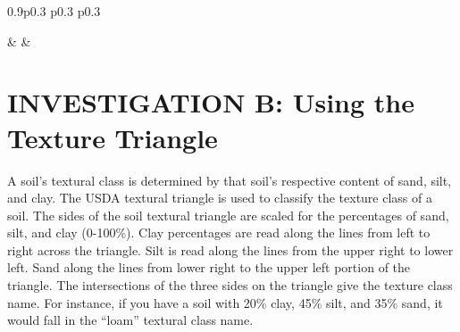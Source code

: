 \documentclass[
  letterpaper,
  twocolumn,
  portrait]{scrbook}
\begin{document}
\begin{table}[h!]
\begin{centerbox}
\begin{threeparttable}
\begin{tabularx}{0.9\textwidth}{p{} p{} p{}}

 &
 &
 \tabularnewline[-0.5pt]


\end{tabularx}
\end{threeparttable}\par\end{centerbox}

\end{table}
 

\hypertarget{investigation-b-using-the-texture-triangle}{%
\section{INVESTIGATION B: Using the Texture
Triangle}\label{investigation-b-using-the-texture-triangle}}

A soil's textural class is determined by that soil's respective content
of sand, silt, and clay. The USDA textural triangle is used to classify
the texture class of a soil. The sides of the soil textural triangle are
scaled for the percentages of sand, silt, and clay (0-100\%). Clay
percentages are read along the lines from left to right across the
triangle. Silt is read along the lines from the upper right to lower
left. Sand along the lines from lower right to the upper left portion of
the triangle. The intersections of the three sides on the triangle give
the texture class name. For instance, if you have a soil with 20\% clay,
45\% silt, and 35\% sand, it would fall in the ``loam'' textural class
name.
\end{document}
